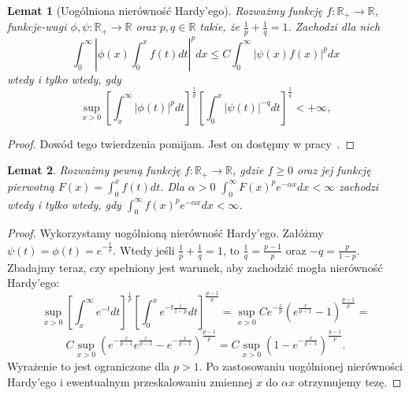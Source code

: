 \documentclass[licencjacka]{pracamgr}
\theoremstyle{definition}
\theoremstyle{definition}
\theoremstyle{plain}
\newtheorem{lemma}{Lemat}[section]
\theoremstyle{plain}
\theoremstyle{plain}
\theoremstyle{plain}
\begin{document}
\begin{lemma}[Uogólniona nierówność Hardy'ego]\label{hardy}
    Rozważmy funkcję $f: \mathbb{R}_{+} \rightarrow \mathbb{R}$, funkcje-wagi
    $\phi, \psi: \mathbb{R}_{+} \rightarrow \mathbb{R}$ oraz $p, q \in
    \mathbb{R}$ takie, że $\frac{1}{p} + \frac{1}{q} = 1 $.  Zachodzi dla nich
\[
\int_0^\infty \left|
                \phi(x) \int_0^x f(t) dt
              \right|^p dx
\leq
C \int_0^\infty \left|
                    \psi(x)  f(x)
                \right|^p dx
\]
wtedy i tylko wtedy, gdy
\[
\sup_{x > 0}
\left[
\int_x^\infty  
   | \phi(t) |^p dt
\right]^{\frac{1}{p}}
\left[
\int_0^x
    | \psi(t) |^{-q} dt
\right]^{\frac{1}{q}} < + \infty,
\]
\end{lemma}
\begin{proof}
Dowód tego twierdzenia pomijam. Jest on dostępny w pracy~\cite{hardys}.
\end{proof}

\begin{lemma}
Rozważmy pewną funkcję $f: \mathbb{R}_{+} \rightarrow \mathbb{R}$, gdzie $f
\geq 0$ oraz jej funkcję pierwotną $F(x) = \int_0^{x} f(t) dt$. Dla $\alpha > 0$ 
 $\int_0^\infty F(x)^pe^{- \alpha x}dx < \infty$
zachodzi wtedy i tylko wtedy, gdy
$\int_0^\infty f(x)^p e^{-\alpha x}dx < \infty$.
\end{lemma}
\begin{proof}
Wykorzystamy uogólnioną nierówność Hardy'ego.  Załóżmy $\psi(t) = \phi(t) =
e^{- \frac{t}{p} }$. Wtedy jeśli $\frac{1}{p} + \frac{1}{q} = 1 $, to
$\frac{1}{q} = \frac{p-1}{p}$ oraz $-q = \frac{p}{1-p}$.  Zbadajmy teraz, czy
spełniony jest warunek, aby zachodzić mogła nierówność Hardy'ego:
$$
\sup_{x > 0}
\left[
\int_x^\infty  
    e^{-t} dt
\right]^{\frac{1}{p}}
\left[
\int_0^x
    e^{-t \frac{1}{1-p}} dt
\right]^{\frac{p-1}{p}}
=
\sup_{x > 0}
    C
    e^{- \frac{x}{p}}
    \left(
        e^{\frac{x}{p-1}} - 1
    \right)^{\frac{p-1}{p}}
=
$$
$$
C
\sup_{x > 0}
    \left(
    e^{- \frac{x}{p-1}}
        e^{\frac{x}{p-1}} -
    e^{- \frac{x}{p-1}}
    \right)^{\frac{p-1}{p}}
=
C
\sup_{x > 0}
    \left(
        1 -
    e^{- \frac{x}{p-1}}
    \right)^{\frac{p-1}{p}}. 
$$
Wyrażenie to jest ograniczone dla $p> 1$. Po zastosowaniu uogólnionej
nierówności Hardy'ego i ewentualnym przeskalowaniu zmiennej $x$ do $\alpha x$
otrzymujemy tezę.
\end{proof}
\end{document}
